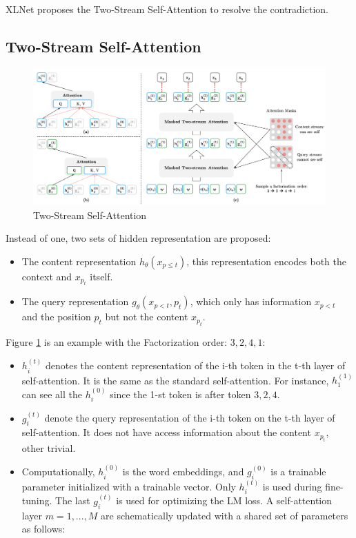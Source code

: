 \documentclass[]{krantz}
\providecommand{\tightlist}{%
  \setlength{\itemsep}{0pt}\setlength{\parskip}{0pt}}
\begin{document}
XLNet proposes the Two-Stream Self-Attention to resolve the contradiction.

\hypertarget{two-stream-self-attention}{%
\subsection{Two-Stream Self-Attention}\label{two-stream-self-attention}}

\begin{figure}

{\centering \includegraphics[width=0.9\linewidth]{figures/02-03-transfer-learning-for-nlp/xlnet_ts} 

}

\caption{Two-Stream Self-Attention}\label{fig:ch02-03-figure011}
\end{figure}

Instead of one, two sets of hidden representation are proposed:

\begin{itemize}
\tightlist
\item
  The content representation \(h_{\theta}(x_{p \leq t})\), this representation encodes both the context and \(x_{p_t}\) itself.
\item
  The query representation \(g_{\theta}(x_{p<t},p_t)\), which only has information \(x_{p<t}\) and the position \(p_t\) but not the content \(x_{p_t}\).
\end{itemize}

Figure \ref{fig:ch02-03-figure011} is an example with the Factorization order: \(3,2,4,1\):

\begin{itemize}
\item
  \(h_i^{(t)}\) denotes the content representation of the i-th token in the t-th layer of self-attention. It is the same as the standard self-attention. For instance, \(h_1^{(1)}\) can see all the \(h_i^{(0)}\) since the 1-st token is after token \({3,2,4}\).
\item
  \(g_i^{(t)}\) denote the query representation of the i-th token on the t-th layer of self-attention. It does not have access information about the content \(x_{p_t}\), other trivial.
\item
  Computationally, \(h_i^{(0)}\) is the word embeddings, and \(g_i^{(0)}\) is a trainable parameter initialized with a trainable vector. Only \(h_i^{(t)}\) is used during fine-tuning. The last \(g_i^{(t)}\) is used for optimizing the LM loss. A self-attention layer \(m=1,..., M\) are schematically updated with a shared set of parameters as follows:
\end{itemize}
\end{document}
